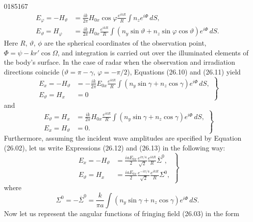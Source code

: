 \begin{scanpage}{0185}{167}
\[
\begin{aligned}E_\varphi=-H_\vartheta&=\frac{ik}{2\pi}H_{0x}\cos\varphi\frac{e^{ikR}}R\int n_ze^{i\Phi}\,dS,\\
E_\vartheta=H_\varphi&=\frac{ik}{2\pi}H_{0x}\frac{e^{ikR}}R\int(n_y\sin\vartheta+n_z\sin\varphi\cos\vartheta)e^{i\Phi}\,dS.
\end{aligned}\tag{26.11}
\]
Here $R$, $\vartheta$, $\phi$ are the spherical coordinates of the observation point, $\Phi=\psi-kr'\cos\Omega$, and integration is carried out over the illuminated elements of the body's surface. In the case of radar when the observation and irradiation directions coincide ($\vartheta=\pi-\gamma$, $\varphi=-\pi/2$), Equations (26.10) and (26.11) yield
\[
\left.\begin{aligned}E_x=-H_\vartheta&=-\frac{ik}{2\pi}E_{0x}\frac{e^{ikR}}R\int(n_y\sin\gamma+n_z\cos\gamma)e^{i\Phi}\,dS,\\
E_\vartheta=H_x&=0
\end{aligned}\right\}\tag{26.12}
\]
and
\[
\left.\begin{aligned}E_\vartheta=H_x&=\frac{ik}{2\pi}H_{0x}\frac{e^{ikR}}R\int(n_y\sin\gamma+n_z\cos\gamma)e^{i\Phi}\,dS,\\
E_x=H_\vartheta&=0.
\end{aligned}\right\}\tag{26.13}
\]
Furthermore, assuming the incident wave amplitudes are specified by Equation (26.02), let us write Expressions (26.12) and (26.13) in the following way:
\[
\left.\begin{aligned}E_x=-H_\vartheta&=\frac{iaE_{0x}}2\frac{e^{i\pi/4}}{\sqrt2}\frac{e^{ikR}}R\overline\Sigma^0,\\
E_\vartheta=H_x&=\frac{iaE_{0x}}2\frac{e^{-i\pi/4}}{\sqrt2}\frac{e^{ikR}}R\Sigma^0,
\end{aligned}\right\}\tag{26.14}
\]
where
\[
\Sigma^0=-\overline\Sigma^0=\frac k{\pi a}\int(n_y\sin\gamma+n_z\cos\gamma)e^{i\Phi}\,dS.\tag{26.15}
\]
Now let us represent the angular functions of fringing field (26.03) in the form
\end{scanpage}
